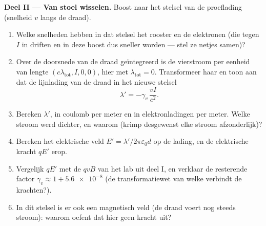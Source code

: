 \begin{problem}
\medskip\noindent\textbf{Deel II --- Van stoel wisselen.}
Boost naar het stelsel van de proeflading (snelheid $v$ langs de draad).
\begin{enumerate}[resume]
  \item Welke snelheden hebben in dat stelsel het rooster en de
        elektronen (die tegen $I$ in driften en in deze boost dus
        sneller worden --- stel ze netjes samen)?
  \item Over de doorsnede van de draad geïntegreerd is de vierstroom per
        eenheid van lengte $(c\lambda_{\text{tot}}, I, 0, 0)$, hier met
        $\lambda_{\text{tot}} = 0$. Transformeer haar en toon aan dat de
        lijnlading van de draad in het nieuwe stelsel
        \[
        \lambda' = -\gamma_v\,\frac{vI}{c^2} .
        \]
  \item Bereken $\lambda'$, in coulomb per meter en in
        elektronladingen per meter. Welke stroom werd dichter, en
        waarom (krimp desgewenst elke stroom afzonderlijk)?
  \item Bereken het elektrische veld $E' = \lambda'/2\pi\varepsilon_0d$
        op de lading, en de elektrische kracht $qE'$ erop.
  \item Vergelijk $qE'$ met de $qvB$ van het lab uit deel I, en verklaar
        de resterende factor $\gamma_v \approx 1 + \num{5.6e-8}$ (de
        transformatiewet van welke  verbindt de krachten?).
  \item In dit stelsel is er ook een magnetisch veld (de draad voert nog
        steeds stroom): waarom oefent dat hier geen kracht uit?
\end{enumerate}


\end{problem}
